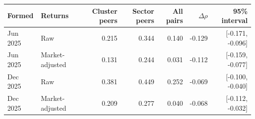 \begin{tabularx}{\linewidth}{@{}l >{\raggedright\arraybackslash}X r r r r r@{}}
\toprule
Formed & Returns & Cluster peers & Sector peers & All pairs & $\Delta\rho$ & 95\% interval \\
\midrule
Jun 2025 & Raw & 0.215 & 0.344 & 0.140 & -0.129 & [-0.171, -0.096] \\
Jun 2025 & Market-adjusted & 0.131 & 0.244 & 0.031 & -0.112 & [-0.159, -0.077] \\
Dec 2025 & Raw & 0.381 & 0.449 & 0.252 & -0.069 & [-0.100, -0.040] \\
Dec 2025 & Market-adjusted & 0.209 & 0.277 & 0.040 & -0.068 & [-0.112, -0.032] \\
\bottomrule
\end{tabularx}
